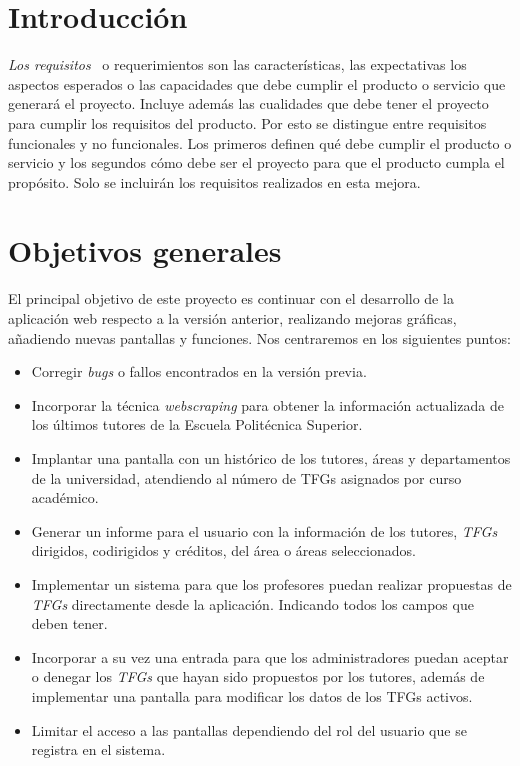 
\section{Introducción}

\textit{Los requisitos}~\cite{Requisito} o requerimientos son las características, las expectativas los aspectos esperados o las capacidades que debe cumplir el producto o servicio que generará el proyecto. Incluye además las cualidades que debe tener el proyecto para cumplir los requisitos del producto. Por esto se distingue entre requisitos funcionales y no funcionales. Los primeros definen qué debe cumplir el producto o servicio y los segundos cómo debe ser el proyecto para que el producto cumpla el propósito.
Solo se incluirán los requisitos realizados en esta mejora.

\section{Objetivos generales}
El principal objetivo de este proyecto es continuar con el desarrollo de la aplicación web respecto a la versión anterior, realizando mejoras gráficas, añadiendo nuevas pantallas y funciones.
Nos centraremos en los siguientes puntos:
\begin{itemize}
	\item Corregir \emph{bugs} o fallos encontrados en la versión previa.
	\item Incorporar la técnica \emph{webscraping} para obtener la información actualizada de los últimos tutores de la Escuela Politécnica Superior.
	\item Implantar una pantalla con un histórico de los tutores, áreas y departamentos de la universidad, atendiendo al número de TFGs asignados por curso académico. 
	\item Generar un informe para el usuario con la información de los tutores, \emph{TFGs} dirigidos, codirigidos y créditos, del área o áreas seleccionados.
	\item Implementar un sistema para que los profesores puedan realizar propuestas de \emph{TFGs} directamente desde la aplicación. Indicando todos los campos que deben tener. 
	\item Incorporar a su vez una entrada para que los administradores puedan aceptar o denegar los \emph{TFGs} que hayan sido propuestos por los tutores, además de implementar una pantalla para modificar los datos de los TFGs activos.
	\item Limitar el acceso a las pantallas dependiendo del rol del usuario que se registra en el sistema.
\end{itemize}

